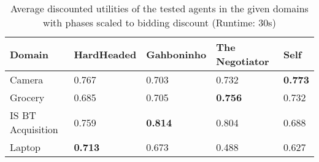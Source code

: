 \begin{table}[H]
  \centering
  \small
  \begin{tabular}{lp{2.5cm}p{2.5cm}p{2.5cm}p{2.5cm}}
   \toprule
   Domain                   & HardHeaded     & Gahboninho & The Negotiator & Self \\ 
   \midrule
  Camera                    & 0.767          & 0.703          & 0.732          & \textbf{0.773} \\ 
  Grocery                   & 0.685          & 0.705          & \textbf{0.756} & 0.732          \\ 
  IS BT Acquisition         & 0.759          & \textbf{0.814} & 0.804          & 0.688          \\ 
  Laptop                    & \textbf{0.713} & 0.673          & 0.488          & 0.627          \\ 
   \bottomrule
  \end{tabular}
  \caption{Average discounted utilities of the tested agents in the given domains with phases scaled to bidding discount (Runtime: $30$s) \label{table:anac2011-domains3}}
\end{table}

